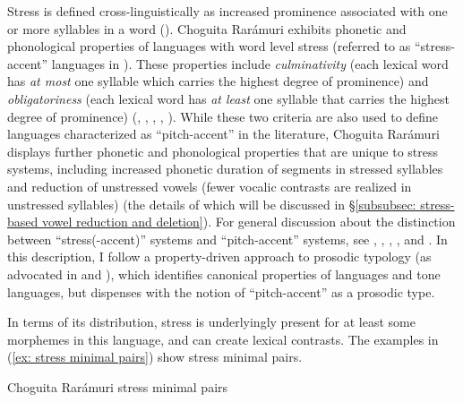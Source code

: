 Stress is defined cross-linguistically as increased prominence associated with one or more syllables in a word (\citealt{gordonvanderhulst2018stress}). Choguita Rarámuri exhibits phonetic and phonological properties of languages with word level stress (referred to as ``stress-accent'' languages in \citealt{hyman2006word}). These properties include \textit{culminativity} (each lexical word has \textit{at most} one syllable which carries the highest degree of prominence) and \textit{obligatoriness} (each lexical word has \textit{at least} one syllable that carries the highest degree of prominence) (\citealt{hyman1977nature}, \citealt{hyman1978tone}, \citealt{beckman1986stress}, \citealt{hayes1995metrical}, \citealt{hyman2006word}). While these two criteria are also used to define languages characterized as ``pitch-accent'' in the literature, Choguita Rarámuri displays further phonetic and phonological properties that are unique to stress systems, including increased phonetic duration of segments in stressed syllables and reduction of unstressed vowels (fewer vocalic contrasts are realized in unstressed syllables) (the details of which will be discussed in §\ref{subsubsec: stress-based vowel reduction and deletion}). For general discussion about the distinction between ``stress(-accent)'' systems and ``pitch-accent'' systems, see \citet{poser1984phonetics}, \citet{hyman1991autosegmental}, \citet{hyman1977nature}, \citet{hyman2001tone}, and \citet{inkelas1988serbo}. In this description, I follow a property-driven approach to prosodic typology (as advocated in \citealt{hyman2006word} and \citealt{hyman2009not}), which identifies canonical properties of languages and tone languages, but dispenses with the notion of ``pitch-accent'' as a prosodic type.

In terms of its distribution, stress is underlyingly present for at least some morphemes in this language, and can create lexical contrasts. The examples in (\ref{ex: stress minimal pairs}) show stress minimal pairs.

\ea\label{ex: stress minimal pairs}
{Choguita Rarámuri stress minimal pairs}

